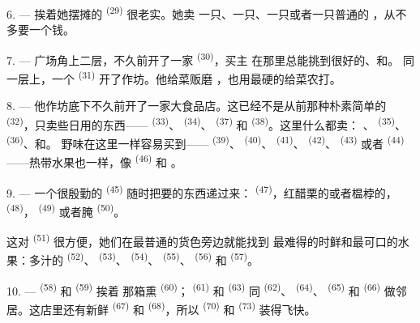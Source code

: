 \VUsaut{4.0mm}
\VUsaut{3.0mm}

6. --- 挨着她摆摊的 \textsuperscript{(29)} 很老实。她卖
一只、一只、一只或者一只普通的
，从不多要一个钱。

7. --- 广场角上二层，不久前开了一家 \textsuperscript{(30)}，买主
在那里总能挑到很好的、和。
同一层上，一个 \textsuperscript{(31)} 开了作坊。他给菜贩磨
，也用最硬的给菜农打。

\VUsaut{4.0mm}
\VUsaut{3.0mm}

8. --- 他作坊底下不久前开了一家大食品店。这已经不是从前那种朴素简单的
 \textsuperscript{(32)}，只卖些日用的东西——
\textsuperscript{(33)}、 \textsuperscript{(34)}、
\textsuperscript{(37)} 和 \textsuperscript{(38)}。这里什么都卖：
、 \textsuperscript{(35)}、
\textsuperscript{(36)}、和。
野味在这里一样容易买到—— \textsuperscript{(39)}、
\textsuperscript{(40)}、 \textsuperscript{(41)}、
\textsuperscript{(42)}、 \textsuperscript{(43)} 或者
\textsuperscript{(44)}——热带水果也一样，像 \textsuperscript{(46)} 和
。

9. --- 一个很殷勤的 \textsuperscript{(45)} 随时把要的东西递过来：
 \textsuperscript{(47)}，红醋栗的或者榅桲的，
\textsuperscript{(48)}， \textsuperscript{(49)} 或者腌
\textsuperscript{(50)}。

这对 \textsuperscript{(51)} 很方便，她们在最普通的货色旁边就能找到
最难得的时鲜和最可口的水果：多汁的 \textsuperscript{(52)}、
 \textsuperscript{(53)}、 \textsuperscript{(54)}、
 \textsuperscript{(55)}、 \textsuperscript{(56)} 和
 \textsuperscript{(57)}。

\VUsaut{4.0mm}
\VUsaut{3.0mm}

10. ---  \textsuperscript{(58)} 和 \textsuperscript{(59)} 挨着
那箱熏 \textsuperscript{(60)}； \textsuperscript{(61)} 和
 \textsuperscript{(63)} 同 \textsuperscript{(62)}、
 \textsuperscript{(64)}、 \textsuperscript{(65)} 和
 \textsuperscript{(66)} 做邻居。这店里还有新鲜
\textsuperscript{(67)} 和 \textsuperscript{(68)}，所以
\textsuperscript{(70)} 和 \textsuperscript{(73)} 装得飞快。


